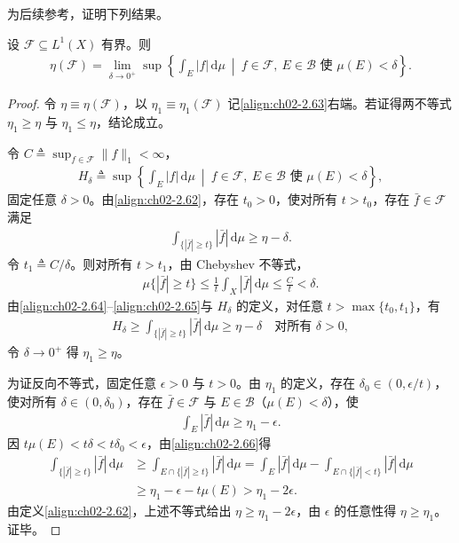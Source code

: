 \documentclass[../../main.tex]{subfiles}%
\begin{document}
为后续参考，证明下列结果。

\begin{lemma}\label{lemma:ch02-一致可积模等价}
设 $\mathscr F\subseteq L^1(X)$ 有界。则
\begin{align}
\eta(\mathscr F)=\lim_{\delta\to0^+}\sup\left\{\int_E|f|\,\mathrm{d}\mu\ \middle|\ f\in\mathscr F,\ E\in\mathscr B\text{ 使 }\mu(E)<\delta\right\}. \label{align:ch02-2.63}
\end{align}
\end{lemma}

\begin{proof}
令 $\eta\equiv\eta(\mathscr F)$，以 $\eta_1\equiv\eta_1(\mathscr F)$ 记\eqref{align:ch02-2.63}右端。若证得两不等式 $\eta_1\geqslant\eta$ 与 $\eta_1\leqslant\eta$，结论成立。

令 $C\triangleq \sup_{f\in\mathscr F}\|f\|_1<\infty$，
\begin{align*}
H_\delta\triangleq \sup\left\{\int_E|f|\,\mathrm{d}\mu\ \middle|\ f\in\mathscr F,\ E\in\mathscr B\text{ 使 }\mu(E)<\delta\right\},
\end{align*}
固定任意 $\delta>0$。由\eqref{align:ch02-2.62}，存在 $t_0>0$，使对所有 $t>t_0$，存在 $\bar f\in\mathscr F$ 满足
\begin{align}
\int_{\{|\bar f|\geqslant t\}}|\bar f|\,\mathrm{d}\mu\geqslant\eta-\delta. \label{align:ch02-2.64}
\end{align}
令 $t_1\triangleq C/\delta$。则对所有 $t>t_1$，由 Chebyshev 不等式，
\begin{align}
\mu\{|\bar f|\geqslant t\}\leqslant\frac1t\int_X|\bar f|\,\mathrm{d}\mu\leqslant\frac Ct<\delta. \label{align:ch02-2.65}
\end{align}
由\eqref{align:ch02-2.64}--\eqref{align:ch02-2.65}与 $H_\delta$ 的定义，对任意 $t>\max\{t_0,t_1\}$，有
\begin{align*}
H_\delta\geqslant\int_{\{|\bar f|\geqslant t\}}|\bar f|\,\mathrm{d}\mu\geqslant\eta-\delta\quad\text{对所有 }\delta>0,
\end{align*}
令 $\delta\to0^+$ 得 $\eta_1\geqslant\eta$。

为证反向不等式，固定任意 $\epsilon>0$ 与 $t>0$。由 $\eta_1$ 的定义，存在 $\delta_0\in(0,\epsilon/t)$，使对所有 $\delta\in(0,\delta_0)$，存在 $\bar f\in\mathscr F$ 与 $E\in\mathscr B$（$\mu(E)<\delta$），使
\begin{align}
\int_E|\bar f|\,\mathrm{d}\mu\geqslant\eta_1-\epsilon. \label{align:ch02-2.66}
\end{align}
因 $t\mu(E)<t\delta<t\delta_0<\epsilon$，由\eqref{align:ch02-2.66}得
\begin{align*}
\int_{\{|\bar f|\geqslant t\}}|\bar f|\,\mathrm{d}\mu
&\geqslant\int_{E\cap\{|\bar f|\geqslant t\}}|\bar f|\,\mathrm{d}\mu
=\int_E|\bar f|\,\mathrm{d}\mu-\int_{E\cap\{|\bar f|<t\}}|\bar f|\,\mathrm{d}\mu\\
&\geqslant\eta_1-\epsilon-t\mu(E)>\eta_1-2\epsilon.
\end{align*}
由定义\eqref{align:ch02-2.62}，上述不等式给出 $\eta\geqslant\eta_1-2\epsilon$，由 $\epsilon$ 的任意性得 $\eta\geqslant\eta_1$。证毕。
\end{proof}
\end{document}
